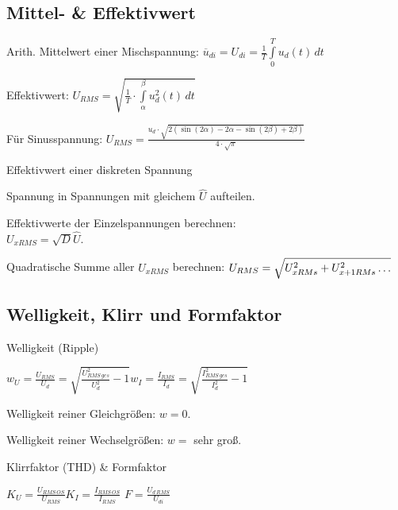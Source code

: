 \documentclass[german]{latex4ei/latex4ei_sheet}
\begin{document}
	\subsection{Mittel- \& Effektivwert}
	\begin{sectionbox}
		\begin{symbolbox}
			\item Arith. Mittelwert einer Mischspannung: $\overline{u}_{di} = U_{di} = \frac{1}{T}\int\limits_0^T u_d(t)\,dt$
			\item Effektivwert: $U_{RMS} = \sqrt{\frac{1}{T}\cdot \int\limits_{\alpha}^\beta u^2_d(t)\,dt}$
			\item Für Sinusspannung: $U_{RMS} = \frac{u_d \cdot \sqrt{2(\sin(2\alpha)-2\alpha - \sin(2\beta)+2\beta)}}{4\cdot\sqrt{\pi}}$
		\end{symbolbox}
		\begin{cookbox}{Effektivwert einer diskreten Spannung}
			\item Spannung in Spannungen mit gleichem $\hat{U}$ aufteilen.
			\item Effektivwerte der Einzelspannungen berechnen:\\ $U_{xRMS} = \sqrt{D} \hat{U}$.
			\item Quadratische Summe aller $U_{xRMS}$ berechnen: $\\ U_{RMS} = \sqrt{U_{xRMs}^2+U_{x+1RMs}^2\dots}$
		\end{cookbox}
	\subsection{Welligkeit, Klirr und Formfaktor}
		\begin{symbolbox}{Welligkeit (Ripple)}
			\item $w_U = \frac{U_{RMS}}{U_d} = \sqrt{\frac{U_{RMS\,ges}^2}{U_d^2}-1}$\qquad $w_I = \frac{I_{RMS}}{I_d} = \sqrt{\frac{I_{RMS\,ges}^2}{I_d^2}-1}$
			\item Welligkeit reiner Gleichgrößen: $w = 0$.
			\item Welligkeit reiner Wechselgrößen: $w =$ sehr groß.
		\end{symbolbox}
		\begin{bluebox}{Klirrfaktor (THD) \& Formfaktor }
			\item $K_U =   \frac{U_{RMS\, OS}}{U_{RMS}}$\qquad $K_I =   \frac{I_{RMS\, OS}}{I_{RMS}}$ \qquad$F = \frac{U_{d\,RMS}}{U_{di}}$
		\end{bluebox}

\end{sectionbox}
\end{document}
